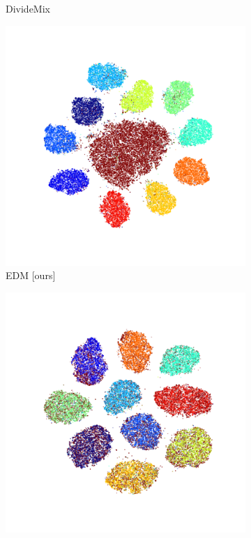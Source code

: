 \documentclass[11pt]{article}
\begin{document}
\begin{figure}[h]
\begin{subfigure}{.18\textwidth}
    \caption*{DivideMix~}
  \end{subfigure}
  \begin{subfigure}{.18\textwidth}
    \centering
    \includegraphics[width=\linewidth]{images/tsne/tsne_EDM_imagenet32_D.png}
    \caption*{EDM [ours]}
  \end{subfigure}
  \begin{subfigure}{.18\textwidth}
    \centering
    \includegraphics[width=\linewidth]{images/tsne/tsne_DM_cifar100.png}

\end{subfigure}
\end{figure}
\end{document}
